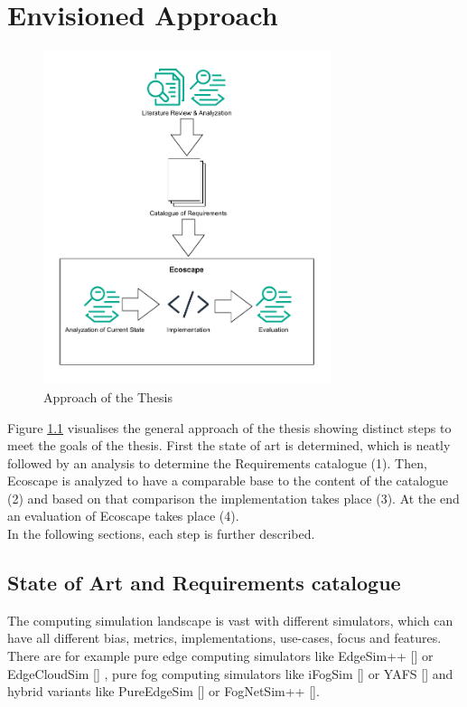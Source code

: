 \chapter{Envisioned Approach}
\begin{figure}
  \centering
  \includegraphics[width=0.75\textwidth]{img/approach_figure.pdf}
  \caption{Approach of the Thesis}
  \label{fig:approach_figure}
\end{figure}

Figure \ref{fig:approach_figure} visualises the general approach of the thesis showing distinct steps to meet the goals of the thesis.
First the state of art is determined, which is neatly followed by an analysis to determine the Requirements catalogue (1).
Then, Ecoscape is analyzed to have a comparable base to the content of the catalogue (2) and based on that comparison the implementation takes place (3).
At the end an evaluation of Ecoscape takes place (4).
\\
In the following sections, each step is further described.
\section{State of Art and Requirements catalogue}\label{approach:state-of-art}
The computing simulation landscape is vast with different simulators, which can have all different bias, metrics, implementations, use-cases, focus and features.
There are for example pure edge computing simulators like EdgeSim++ [\cite{10612841}] or EdgeCloudSim [\cite{10.1002/ett.3493}] , pure fog computing simulators like iFogSim [\cite{gupta2016ifogsimtoolkitmodelingsimulation}] or YAFS [\cite{8758823}] and hybrid variants like PureEdgeSim [\cite{9188059}] or FogNetSim++ [\cite{8502760}].

